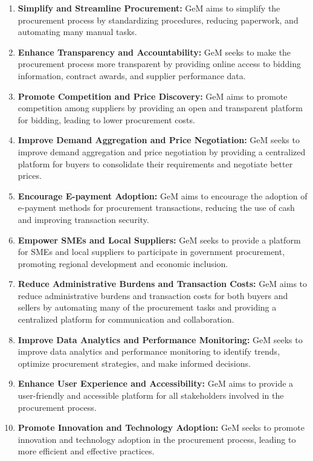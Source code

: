 \begin{enumerate}
    \item \textbf{Simplify and Streamline Procurement:} GeM aims to simplify the procurement process by standardizing procedures, reducing paperwork, and automating many manual tasks.
    
    \item \textbf{Enhance Transparency and Accountability:} GeM seeks to make the procurement process more transparent by providing online access to bidding information, contract awards, and supplier performance data.
    
    \item \textbf{Promote Competition and Price Discovery:} GeM aims to promote competition among suppliers by providing an open and transparent platform for bidding, leading to lower procurement costs.
    
    \item \textbf{Improve Demand Aggregation and Price Negotiation:} GeM seeks to improve demand aggregation and price negotiation by providing a centralized platform for buyers to consolidate their requirements and negotiate better prices.
    
    \item \textbf{Encourage E-payment Adoption:} GeM aims to encourage the adoption of e-payment methods for procurement transactions, reducing the use of cash and improving transaction security.
    
    \item \textbf{Empower SMEs and Local Suppliers:} GeM seeks to provide a platform for SMEs and local suppliers to participate in government procurement, promoting regional development and economic inclusion.
    
    \item \textbf{Reduce Administrative Burdens and Transaction Costs:} GeM aims to reduce administrative burdens and transaction costs for both buyers and sellers by automating many of the procurement tasks and providing a centralized platform for communication and collaboration.
    
    \item \textbf{Improve Data Analytics and Performance Monitoring:} GeM seeks to improve data analytics and performance monitoring to identify trends, optimize procurement strategies, and make informed decisions.
    
    \item \textbf{Enhance User Experience and Accessibility:} GeM aims to provide a user-friendly and accessible platform for all stakeholders involved in the procurement process.
    
    \item \textbf{Promote Innovation and Technology Adoption:} GeM seeks to promote innovation and technology adoption in the procurement process, leading to more efficient and effective practices.
\end{enumerate}


